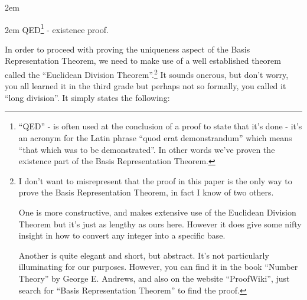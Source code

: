 \documentclass{article}
\newenvironment{jprIn}{\begin{adjustwidth}{2em}{}}{\end{adjustwidth}}
\begin{document}
\begin{jprIn}
\begin{jprIn}
QED\footnote{``QED'' - is often used at the conclusion of a proof to state that it’s
done - it’s an acronym for the Latin phrase ``quod erat demonstrandum'' which means ``that which was to be demonstrated''.
In other words we’ve proven the existence part of the Basis Representation Theorem.} - existence proof.
\end{jprIn}
\end{jprIn}
\bigskip

\break
In order to proceed
with proving the uniqueness aspect of the Basis Representation Theorem, we
need to make use of a well established theorem
called the ``Euclidean Division Theorem''.\footnote{I don't want to misrepresent that the proof in
this paper is the only way to prove the
Basis Representation Theorem, in fact I know of two others. 

One is more constructive,
and makes extensive use of the Euclidean Division Theorem but it's just as lengthy as ours here. However it does give
some nifty insight in how to convert any integer into a specific base.

Another is quite elegant and short, but abstract. It's not particularly illuminating for our purposes.
However, you can find it in the book ``Number Theory'' by George E. Andrews, and also on
the website ``ProofWiki'', just search for ``Basis Representation Theorem'' to find the proof.}
It sounds onerous, but don’t worry, you all learned it
in the third grade but perhaps not so formally, you called it ``long division''. It simply states the following:
\end{document}
